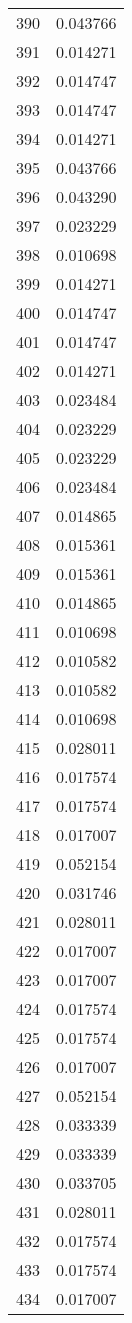 \documentclass[12pt]{article}
\begin{document}
\begin{longtable}{@{}cc@{}}
390 & 0.043766 \\
391 & 0.014271 \\
392 & 0.014747 \\
393 & 0.014747 \\
394 & 0.014271 \\
395 & 0.043766 \\
396 & 0.043290 \\
397 & 0.023229 \\
398 & 0.010698 \\
399 & 0.014271 \\
400 & 0.014747 \\
401 & 0.014747 \\
402 & 0.014271 \\
403 & 0.023484 \\
404 & 0.023229 \\
405 & 0.023229 \\
406 & 0.023484 \\
407 & 0.014865 \\
408 & 0.015361 \\
409 & 0.015361 \\
410 & 0.014865 \\
411 & 0.010698 \\
412 & 0.010582 \\
413 & 0.010582 \\
414 & 0.010698 \\
415 & 0.028011 \\
416 & 0.017574 \\
417 & 0.017574 \\
418 & 0.017007 \\
419 & 0.052154 \\
420 & 0.031746 \\
421 & 0.028011 \\
422 & 0.017007 \\
423 & 0.017007 \\
424 & 0.017574 \\
425 & 0.017574 \\
426 & 0.017007 \\
427 & 0.052154 \\
428 & 0.033339 \\
429 & 0.033339 \\
430 & 0.033705 \\
431 & 0.028011 \\
432 & 0.017574 \\
433 & 0.017574 \\
434 & 0.017007 \\

\end{longtable}
\end{document}
